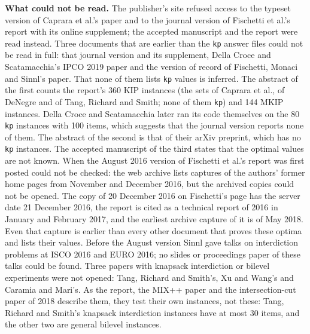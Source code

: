\textbf{What could not be read.} The publisher's site refused access to the
typeset version of Caprara et al.'s paper and to the journal version of
Fischetti et al.'s report with its online supplement; the accepted manuscript
and the report were read instead. Three documents that are earlier than the
\texttt{kp} answer files could not be read in full: that journal version and its
supplement,\cite{fischetti2019interdiction} Della Croce and Scatamacchia's IPCO
2019 paper\cite{dellacroce2019lower} and the version of record of Fischetti,
Monaci and Sinnl's paper.\cite{fischetti2018dynamic} That none of them lists
\texttt{kp} values is inferred. The abstract of the first counts the report's
360 KIP instances (the sets of Caprara et al., of
DeNegre\cite{denegre2011thesis} and of Tang, Richard and
Smith;\cite{tang2016class} none of them \texttt{kp}) and 144 MKIP instances.
Della Croce and Scatamacchia later ran its code themselves on the 80
\texttt{kp} instances with 100 items, which suggests that the journal version
reports none of them. The abstract of the second is that of their arXiv preprint, which
has no \texttt{kp} instances. The accepted manuscript of the third states that
the optimal values are not known. When the August 2016 version of Fischetti et
al.'s report was first posted could not be checked: the web archive lists
captures of the authors' former home pages from November and December 2016, but
the archived copies could not be opened. The copy of 20 December 2016 on
Fischetti's page has the server date 21 December 2016, the report is cited as a
technical report of 2016 in January and February 2017, and the earliest archive
capture of it is of May 2018. Even that capture is earlier than every other
document that proves these optima and lists their values. Before the August
version Sinnl gave talks on interdiction problems at ISCO 2016 and EURO 2016; no
slides or proceedings paper of these talks could be found. Three papers with knapsack interdiction or
bilevel experiments were not opened: Tang, Richard and Smith's,\cite{tang2016class}
Xu and Wang's\cite{xu2014exact} and Caramia and Mari's.\cite{caramia2015enhanced}
As the report, the MIX++ paper and the intersection-cut paper of 2018 describe
them,\cite{fischetti2017new,fischetti2018intersection} they test their own
instances, not these: Tang, Richard and Smith's knapsack interdiction instances
have at most 30 items, and the other two are general bilevel instances.
